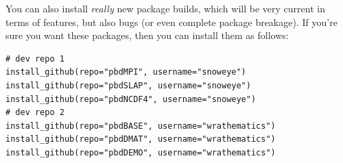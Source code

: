 You can also install \emph{really} new package builds, which will be very current in terms of features, but also bugs (or even complete package breakage).  If you're sure you want these packages, then you can install them as follows:

\begin{lstlisting}[language=rr]
# dev repo 1
install_github(repo="pbdMPI", username="snoweye")
install_github(repo="pbdSLAP", username="snoweye")
install_github(repo="pbdNCDF4", username="snoweye")
# dev repo 2
install_github(repo="pbdBASE", username="wrathematics")
install_github(repo="pbdDMAT", username="wrathematics")
install_github(repo="pbdDEMO", username="wrathematics")
\end{lstlisting}
